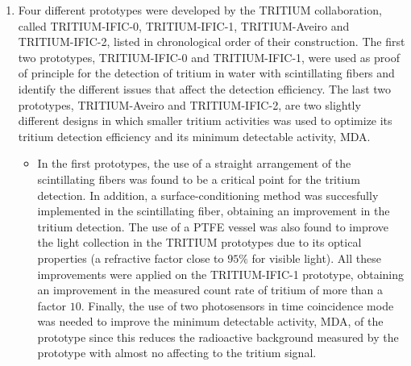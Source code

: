 \begin{enumerate}
\begin{enumerate}
\end{enumerate}


\item{} Four different prototypes were developed by the TRITIUM collaboration, called TRITIUM-IFIC-0, TRITIUM-IFIC-1, TRITIUM-Aveiro and TRITIUM-IFIC-2, listed in chronological order of their construction. The first two prototypes, TRITIUM-IFIC-0 and TRITIUM-IFIC-1, were used as proof of principle for the detection of tritium in water with scintillating fibers and identify the different issues that affect the detection efficiency. The last two prototypes, TRITIUM-Aveiro and TRITIUM-IFIC-2, are two slightly different designs in which smaller tritium activities was used to optimize its tritium detection efficiency and its minimum detectable activity, MDA. %

\begin{itemize}

\item{} In the first prototypes, the use of a straight arrangement of the scintillating fibers was found to be a critical point for the tritium detection. In addition, a surface-conditioning method was succesfully implemented in the scintillating fiber, obtaining an improvement in the tritium detection. The use of a PTFE vessel was also found to improve the light collection in the TRITIUM prototypes due to its optical properties (a refractive factor close to $95\%$ for visible light). All these improvements were applied on the TRITIUM-IFIC-1 prototype, obtaining an improvement in the measured count rate of tritium of more than a factor $10$. Finally, the use of two photosensors in time coincidence mode was needed to improve the minimum detectable activity, MDA, of the prototype since this reduces the radioactive background measured by the prototype with almost no affecting to the tritium signal.


\end{itemize}
\end{enumerate}
